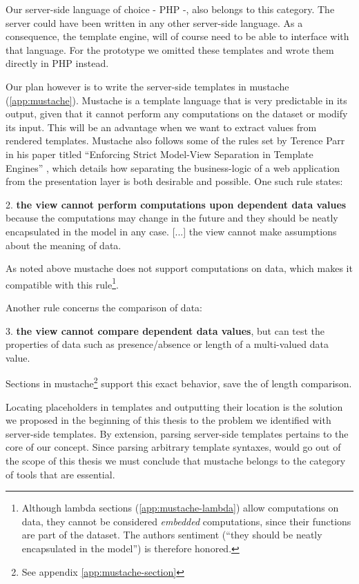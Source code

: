 \documentclass[thesis.tex]{subfiles}
\begin{document}
Our server-side language of choice - PHP -, also belongs to this category.
The server could have been written in any other server-side language.
As a consequence, the template engine, will of course need to be
able to interface with that language. For the prototype we omitted these
templates and wrote them directly in PHP instead.

Our plan however is to write the server-side templates in mustache
(\ref{app:mustache}). Mustache is a template language that is very
predictable in its output, given that it cannot perform any computations on the
dataset or modify its input. This will be an advantage when we want to extract
values from rendered templates. Mustache also follows some of the rules set by
Terence Parr in his paper titled ``Enforcing Strict Model-View Separation in
Template Engines'' \cite{STRINGTPL}, which details how separating the
business-logic of a web application from the presentation layer is both
desirable and possible. One such rule states:
\begin{citequote}{\cite[Chapter 7]{STRINGTPL}}
	2. \textbf{the view cannot perform computations upon dependent data values}
	because the computations may change in the future and
	they should be neatly encapsulated in the model in any case.
	[...] the view cannot make assumptions about the meaning of data.
\end{citequote}
As noted above mustache does not support computations on data, which makes it
compatible with this rule\footnote{Although lambda sections
(\ref{app:mustache-lambda}) allow computations on data,
they cannot be considered \emph{embedded} computations,
since their functions are part of the dataset.
The authors sentiment (``they should be neatly encapsulated in the model'')
is therefore honored.}.

Another rule concerns the comparison of data:
\begin{citequote}{\cite[Chapter 7]{STRINGTPL}}
	3. \textbf{the view cannot compare dependent data values},
	but can test the properties of data such as presence/absence
	or length of a multi-valued data value.
\end{citequote}
Sections in mustache\footnote{See appendix \ref{app:mustache-section}} support
this exact behavior, save the of length comparison.

Locating placeholders in templates and outputting their location is the solution
we proposed in the beginning of this thesis to the problem we identified with
server-side templates.
By extension, parsing server-side templates pertains to the core of our concept.
Since parsing arbitrary template syntaxes, would go out of the scope of this
thesis we must conclude that mustache belongs to the category of tools that
are essential.
\end{document}
